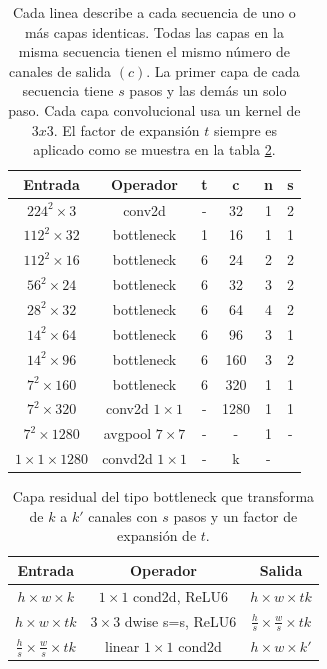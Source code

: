 \begin{table}[H]
    \centering
    \begin{tabular}{cccccc}\hline
        Entrada                  & Operador            & t & c    & n & s \\ \hline
        $224^2 \times 3$         & conv2d              & - & 32   & 1 & 2 \\
        $112^2 \times 32$        & bottleneck          & 1 & 16   & 1 & 1 \\
        $112^2 \times 16$        & bottleneck          & 6 & 24   & 2 & 2 \\
        $56^2 \times 24$         & bottleneck          & 6 & 32   & 3 & 2 \\
        $28^2 \times 32$         & bottleneck          & 6 & 64   & 4 & 2 \\
        $14^2 \times 64$         & bottleneck          & 6 & 96   & 3 & 1 \\
        $14^2 \times 96$         & bottleneck          & 6 & 160  & 3 & 2 \\
        $7^2 \times 160$         & bottleneck          & 6 & 320  & 1 & 1 \\
        $7^2 \times 320$         & conv2d $1\times 1$  & - & 1280 & 1 & 1 \\
        $7^2 \times 1280$        & avgpool $7\times 7$ & - & -    & 1 & - \\
        $1 \times 1 \times 1280$ & convd2d $1\times 1$ & - & k    & - &   \\ \hline
    \end{tabular}
    \caption{Cada linea describe a cada secuencia de uno o más capas identicas. Todas las capas en la misma secuencia tienen el mismo número de canales de salida $(c)$. La primer capa de cada secuencia tiene $s$ pasos y las demás un solo paso. Cada capa convolucional usa un kernel de $3x3$. El factor de expansión $t$ siempre es aplicado como se muestra en la tabla \ref{table:factor}.}
    \label{table:mobilenetv2}
\end{table}

\begin{table}[H]
    \centering
    \begin{tabular}{ccc}\hline
        Entrada                                   & Operador                     & Salida                                    \\ \hline
        $h\times w \times k$                      & $1\times 1$ cond2d, ReLU6    & $h\times w \times tk$                     \\
        $h\times w \times tk$                     & $3\times 3$ dwise s=s, ReLU6 & $\frac{h}{s}\times \frac{w}{s} \times tk$ \\
        $\frac{h}{s}\times \frac{w}{s} \times tk$ & linear $1\times 1$ cond2d    & $h\times w \times k'$                     \\ \hline
    \end{tabular}
    \caption{Capa residual del tipo bottleneck que transforma de $k$ a $k'$ canales con $s$ pasos y un factor de expansión de $t$.}
    \label{table:factor}
\end{table}
